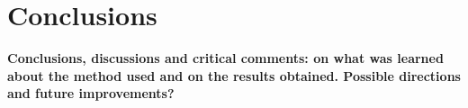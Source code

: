 \chapter{Conclusions}
\textbf{Conclusions, discussions and critical comments: on what was learned about the
method used and on the results obtained. Possible directions and future
improvements? }